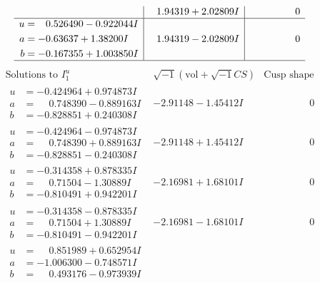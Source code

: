 \documentclass[1p]{elsarticle_modified}
\theoremstyle{definition}
\newcommand{\I}{\sqrt{-1}}
\begin{document}
$$\begin{array}{c|c|c}
 & \phantom{-}1.94319 + 2.02809 I & \phantom{-0.000000 } 0 \\ \hline\begin{aligned}
u &= \phantom{-}0.526490 - 0.922044 I \\
a &= -0.63637 + 1.38200 I \\
b &= -0.167355 + 1.003850 I\end{aligned}
 & \phantom{-}1.94319 - 2.02809 I & \phantom{-0.000000 } 0\\
 \hline 
 \end{array}$$\newpage$$\begin{array}{c|c|c}  
\text{Solutions to }I^u_{1}& \I (\text{vol} + \sqrt{-1}CS) & \text{Cusp shape}\\
 \hline 
\begin{aligned}
u &= -0.424964 + 0.974873 I \\
a &= \phantom{-}0.748390 - 0.889163 I \\
b &= -0.828851 + 0.240308 I\end{aligned}
 & -2.91148 - 1.45412 I & \phantom{-0.000000 } 0 \\ \hline\begin{aligned}
u &= -0.424964 - 0.974873 I \\
a &= \phantom{-}0.748390 + 0.889163 I \\
b &= -0.828851 - 0.240308 I\end{aligned}
 & -2.91148 + 1.45412 I & \phantom{-0.000000 } 0 \\ \hline\begin{aligned}
u &= -0.314358 + 0.878335 I \\
a &= \phantom{-}0.71504 - 1.30889 I \\
b &= -0.810491 + 0.942201 I\end{aligned}
 & -2.16981 + 1.68101 I & \phantom{-0.000000 } 0 \\ \hline\begin{aligned}
u &= -0.314358 - 0.878335 I \\
a &= \phantom{-}0.71504 + 1.30889 I \\
b &= -0.810491 - 0.942201 I\end{aligned}
 & -2.16981 - 1.68101 I & \phantom{-0.000000 } 0 \\ \hline\begin{aligned}
u &= \phantom{-}0.851989 + 0.652954 I \\
a &= -1.006300 - 0.748571 I \\
b &= \phantom{-}0.493176 - 0.973939 I\end{aligned}

\end{array}$$
\end{document}
